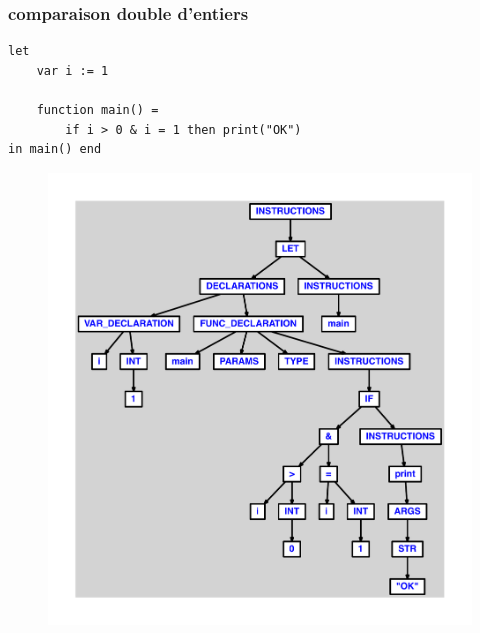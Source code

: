\documentclass{article}
\begin{document}
\subsubsection{comparaison double d'entiers}
\begin{lstlisting}
let
	var i := 1

	function main() =
		if i > 0 & i = 1 then print("OK")
in main() end
\end{lstlisting}
\newpage
\begin{figure}[H]
\centering
\includegraphics[max width=\textwidth]{ast/ast_173.pdf}
\end{figure}
\newpage
\end{document}

